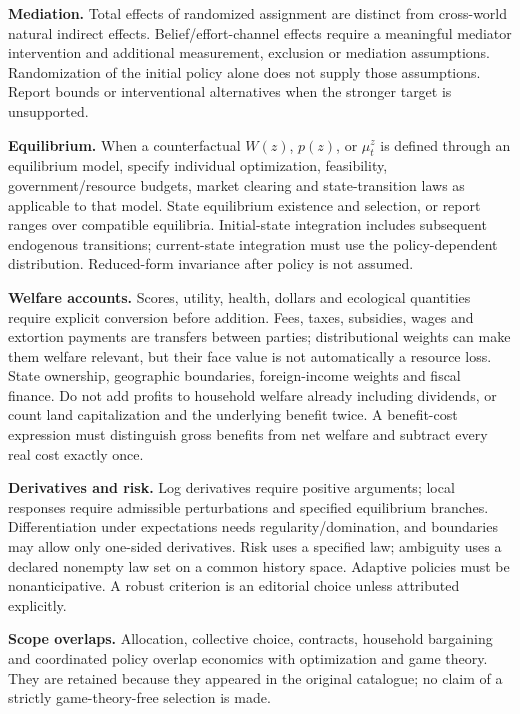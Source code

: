 \documentclass[11pt,a4paper]{article}
\begin{document}
\textbf{Mediation.} Total effects of randomized assignment are distinct from cross-world natural indirect effects. Belief/effort-channel effects require a meaningful mediator intervention and additional measurement, exclusion or mediation assumptions. Randomization of the initial policy alone does not supply those assumptions. Report bounds or interventional alternatives when the stronger target is unsupported.

\textbf{Equilibrium.} When a counterfactual \(W(z)\), \(p(z)\), or \(\mu_t^z\) is defined through an equilibrium model, specify individual optimization, feasibility, government/resource budgets, market clearing and state-transition laws as applicable to that model. State equilibrium existence and selection, or report ranges over compatible equilibria. Initial-state integration includes subsequent endogenous transitions; current-state integration must use the policy-dependent distribution. Reduced-form invariance after policy is not assumed.

\textbf{Welfare accounts.} Scores, utility, health, dollars and ecological quantities require explicit conversion before addition. Fees, taxes, subsidies, wages and extortion payments are transfers between parties; distributional weights can make them welfare relevant, but their face value is not automatically a resource loss. State ownership, geographic boundaries, foreign-income weights and fiscal finance. Do not add profits to household welfare already including dividends, or count land capitalization and the underlying benefit twice. A benefit-cost expression must distinguish gross benefits from net welfare and subtract every real cost exactly once.

\textbf{Derivatives and risk.} Log derivatives require positive arguments; local responses require admissible perturbations and specified equilibrium branches. Differentiation under expectations needs regularity/domination, and boundaries may allow only one-sided derivatives. Risk uses a specified law; ambiguity uses a declared nonempty law set on a common history space. Adaptive policies must be nonanticipative. A robust criterion is an editorial choice unless attributed explicitly.

\textbf{Scope overlaps.} Allocation, collective choice, contracts, household bargaining and coordinated policy overlap economics with optimization and game theory. They are retained because they appeared in the original catalogue; no claim of a strictly game-theory-free selection is made.
\end{document}
